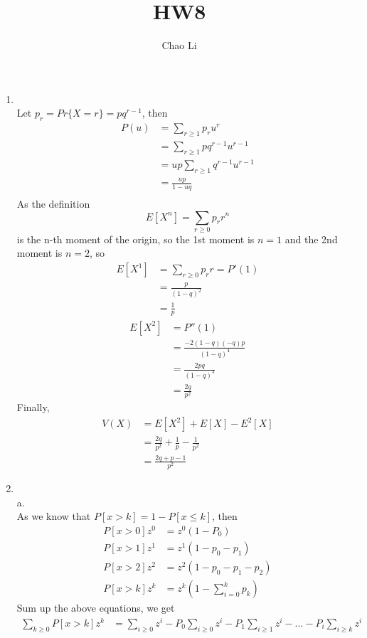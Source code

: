 \documentclass{article}
\title{HW8}
\author{Chao Li}
\begin{document}
\maketitle
\begin{enumerate}
\item \hfill\\
Let \(p_r=Pr\{X=r\}=pq^{r-1}\), then
\begin{align*}
  P(u)&=\sum_{r\geq 1}p_ru^r \\
  &=\sum_{r\geq 1}pq^{r-1}u^{r-1} \\
  &=up\sum_{r\geq 1}q^{r-1}u^{r-1} \\
  &=\frac{up}{1-uq} \\
\end{align*}
As the definition \\
\[
E[X^n]=\sum_{r\geq 0}p_rr^n
\]
is the n-th moment of the origin, so the 1st moment is \(n=1\) and the
2nd moment is \(n=2\), so
\begin{align*}
E[X^1]&=\sum_{r\geq 0}p_rr=P'(1)\\
&=\frac{p}{(1-q)^2} \\
&=\frac{1}{p}
\end{align*}
\begin{align*}
E[X^2]&=P''(1) \\
&=\frac{-2(1-q)(-q)p}{(1-q)^4} \\
&=\frac{2pq}{(1-q)^3} \\
&=\frac{2q}{p^2}
\end{align*}
Finally,
\begin{align*}
V(X)&=E[X^2]+E[X]-E^2[X] \\
&=\frac{2q}{p^2}+\frac{1}{p}-\frac{1}{p^2} \\
&=\frac{2q+p-1}{p^2}
\end{align*}
\item \hfill\\
a. \\
As we know that \(P[x>k]=1-P[x\leq k]\), then
\begin{align*}
P[x>0]z^0&=z^0(1-P_0) \\
P[x>1]z^1&=z^1(1-p_0-p_1) \\
P[x>2]z^2&=z^2(1-p_0-p_1-p_2) \\
P[x>k]z^k&=z^k(1-\sum_{i=0}^{k}p_k) 
\end{align*}
Sum up the above equations, we get
\begin{align*}
\sum_{k\geq 0}P[x>k]z^k&=\sum_{i\geq 0}z^i-P_0\sum_{i\geq 0}z^i-P_1\sum_{i\geq 1}z^i-...-P_i\sum_{i\geq k}z^i \\

\end{align*}
\end{enumerate}
\end{document}
